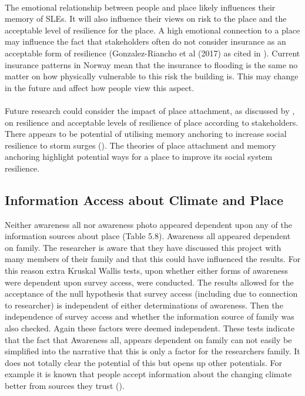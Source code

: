 \paragraph{}

The emotional relationship between people and place likely influences their memory of SLEs. It will also influence their views on risk to the place and the acceptable level of resilience for the place. A high emotional connection to a place may influence the fact that stakeholders often do not consider insurance as an acceptable form of resilience (Gonzalez-Riancho et al (2017) as cited in \cite{gerkensmeier_governing_2018}). Current insurance patterns in Norway mean that the insurance to flooding is the same no matter on how physically vulnerable to this risk the building is. This may change in the future and affect how people view this aspect.
\paragraph{}
Future research could consider the impact of place attachment, as discussed by \cite{ariccio_place_2021}, on resilience and acceptable levels of resilience of place according to stakeholders. There appears to be potential of utilising memory anchoring to increase social resilience to storm surges (\cite{de_guttry_expiry_2022}).  The theories of place attachment and memory anchoring highlight potential ways for a place to improve its social system resilience. 


\subsection{Information Access about Climate and Place}
Neither awareness all nor awareness photo appeared dependent upon any of the information sources about place  (Table 5.8). Awareness all appeared dependent on family. The researcher is aware that they have discussed this project with many members of their family and that this could have influenced the results. For this reason extra Kruskal Wallis tests, upon whether either forms of awareness were dependent upon survey access, were conducted. The results allowed for the acceptance of the null hypothesis that survey access (including due to connection to researcher) is independent of either determinations of awareness. Then the independence of survey access and whether the information source of family was also checked. Again these factors were deemed independent. These tests indicate that the fact that Awareness all, appears dependent on family can not easily be simplified into the narrative that this is only a factor for the researchers family. It does not totally clear the potential of this but opens up other potentials. For example it is known that people accept information about the changing climate better from sources they trust (\cite{corner_a_principles_2018}). 
